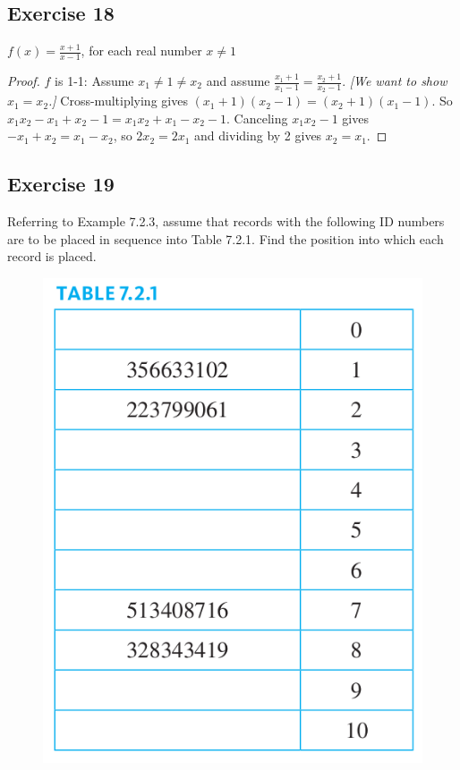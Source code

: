 \documentclass[14pt]{extarticle}
\newcommand{\dps}{\displaystyle}
\begin{document}
\subsection{Exercise 18}
\(\dps f(x) = \frac{x+1}{x-1}\), for each real number \(x \neq 1\)

\begin{proof}
$f$ is 1-1: Assume \(x_1 \neq 1 \neq x_2\) and assume \(\frac{x_1+1}{x_1-1} = \frac{x_2+1}{x_2-1}\).
{\it [We want to show \(x_1 = x_2\).]} Cross-multiplying gives \((x_1+1)(x_2-1) = (x_2+1)(x_1-1)\). So
\(x_1x_2 - x_1 + x_2 - 1 = x_1x_2 + x_1 - x_2 - 1\). Canceling $x_1x_2 - 1$ gives \(-x_1 + x_2 = x_1 - x_2\), so 
\(2x_2 = 2x_1\) and dividing by 2 gives \(x_2 = x_1\).
\end{proof}

\subsection{Exercise 19}
Referring to Example 7.2.3, assume that records with the following ID numbers are to be placed in sequence into 
Table 7.2.1. Find the position into which each record is placed.

\begin{figure}[ht!]
\centering
\includegraphics[scale=0.3]{../images/7.2.1.png}
\end{figure}
\end{document}
